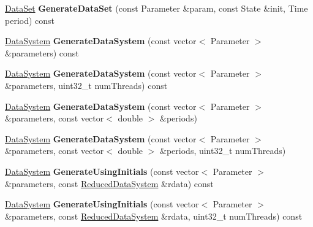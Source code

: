 \begin{DoxyCompactItemize}
\item 
\hypertarget{struct_d_r_d_s_p_1_1_data_generator_a19239aced22c8f7a4796881c2dcc9509}{\hyperlink{struct_d_r_d_s_p_1_1_data_set}{Data\-Set} {\bfseries Generate\-Data\-Set} (const Parameter \&param, const State \&init, Time period) const }\label{struct_d_r_d_s_p_1_1_data_generator_a19239aced22c8f7a4796881c2dcc9509}

\item 
\hypertarget{struct_d_r_d_s_p_1_1_data_generator_a1fbe19665008e167d89c1eff0486f97f}{\hyperlink{struct_d_r_d_s_p_1_1_data_system}{Data\-System} {\bfseries Generate\-Data\-System} (const vector$<$ Parameter $>$ \&parameters) const }\label{struct_d_r_d_s_p_1_1_data_generator_a1fbe19665008e167d89c1eff0486f97f}

\item 
\hypertarget{struct_d_r_d_s_p_1_1_data_generator_a3ec35ebf85e8b1bef8d918858a4a17ee}{\hyperlink{struct_d_r_d_s_p_1_1_data_system}{Data\-System} {\bfseries Generate\-Data\-System} (const vector$<$ Parameter $>$ \&parameters, uint32\-\_\-t num\-Threads) const }\label{struct_d_r_d_s_p_1_1_data_generator_a3ec35ebf85e8b1bef8d918858a4a17ee}

\item 
\hypertarget{struct_d_r_d_s_p_1_1_data_generator_a376347b59afc8bcad1fb7d053fa28880}{\hyperlink{struct_d_r_d_s_p_1_1_data_system}{Data\-System} {\bfseries Generate\-Data\-System} (const vector$<$ Parameter $>$ \&parameters, const vector$<$ double $>$ \&periods)}\label{struct_d_r_d_s_p_1_1_data_generator_a376347b59afc8bcad1fb7d053fa28880}

\item 
\hypertarget{struct_d_r_d_s_p_1_1_data_generator_abed4f9d56ca01b753a5f813a59ce80d5}{\hyperlink{struct_d_r_d_s_p_1_1_data_system}{Data\-System} {\bfseries Generate\-Data\-System} (const vector$<$ Parameter $>$ \&parameters, const vector$<$ double $>$ \&periods, uint32\-\_\-t num\-Threads)}\label{struct_d_r_d_s_p_1_1_data_generator_abed4f9d56ca01b753a5f813a59ce80d5}

\item 
\hypertarget{struct_d_r_d_s_p_1_1_data_generator_aa07aa07557b333be8ebf7cadc885187d}{\hyperlink{struct_d_r_d_s_p_1_1_data_system}{Data\-System} {\bfseries Generate\-Using\-Initials} (const vector$<$ Parameter $>$ \&parameters, const \hyperlink{struct_d_r_d_s_p_1_1_reduced_data_system}{Reduced\-Data\-System} \&rdata) const }\label{struct_d_r_d_s_p_1_1_data_generator_aa07aa07557b333be8ebf7cadc885187d}

\item 
\hypertarget{struct_d_r_d_s_p_1_1_data_generator_a45aed00995e71fba7eeaabd116afdf4a}{\hyperlink{struct_d_r_d_s_p_1_1_data_system}{Data\-System} {\bfseries Generate\-Using\-Initials} (const vector$<$ Parameter $>$ \&parameters, const \hyperlink{struct_d_r_d_s_p_1_1_reduced_data_system}{Reduced\-Data\-System} \&rdata, uint32\-\_\-t num\-Threads) const }\label{struct_d_r_d_s_p_1_1_data_generator_a45aed00995e71fba7eeaabd116afdf4a}


\end{DoxyCompactItemize}
